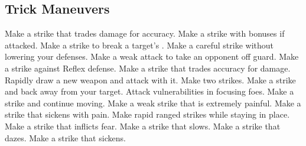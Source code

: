 \small
\subsection{Trick Maneuvers}\label{Trick Maneuvers}
\begin{spelllist}
 Make a strike that trades damage for accuracy.
 Make a strike with bonuses if attacked.
 Make a strike to break a target's .
 Make a careful strike without lowering your defenses.
 Make a weak attack to take an opponent off guard.
 Make a strike against Reflex defense.
 Make a strike that trades accuracy for damage.
 Rapidly draw a new weapon and attack with it.
 Make two strikes.
 Make a strike and back away from your target.
 Attack vulnerabilities in focusing foes.
 Make a strike and continue moving.
 Make a weak strike that is extremely painful.
 Make a strike that sickens with pain.
 Make rapid ranged strikes while staying in place.
 Make a strike that inflicts fear.
 Make a strike that slows.
 Make a strike that dazes.
 Make a strike that sickens.
\end{spelllist}



\small
